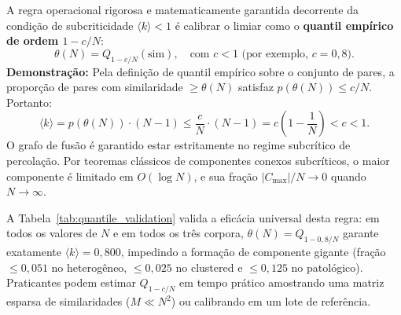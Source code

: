 \documentclass[11pt,a4paper]{article}
\theoremstyle{definition}
\begin{document}
A regra operacional rigorosa e matematicamente garantida decorrente da condi\c{c}\~ao de subcriticidade $\langle k \rangle < 1$ \'e calibrar o limiar como o \textbf{quantil emp\'irico de ordem $1 - c/N$}:
\begin{equation}
\theta(N) = Q_{1 - c/N}(\mathrm{sim}), \quad \text{com } c < 1 \text{ (por exemplo, } c = 0{,}8\text{)}.
\end{equation}
\textbf{Demonstra\c{c}\~ao:} Pela defini\c{c}\~ao de quantil emp\'irico sobre o conjunto de pares, a propor\c{c}\~ao de pares com similaridade $\ge \theta(N)$ satisfaz $p(\theta(N)) \le c/N$. Portanto:
\[
\langle k \rangle = p(\theta(N)) \cdot (N - 1) \le \frac{c}{N} \cdot (N - 1) = c \left(1 - \frac{1}{N}\right) < c < 1.
\]
O grafo de fus\~ao \'e garantido estar estritamente no regime subcr\'itico de percola\c{c}\~ao. Por teoremas cl\'assicos de componentes conexos subcr\'iticos, o maior componente \'e limitado em $O(\log N)$, e sua fra\c{c}\~ao $|C_{\max}|/N \to 0$ quando $N \to \infty$.

A Tabela~\ref{tab:quantile_validation} valida a efic\'acia universal desta regra: em todos os valores de $N$ e em todos os tr\^es corpora, $\theta(N) = Q_{1 - 0{,}8/N}$ garante exatamente $\langle k \rangle = 0{,}800$, impedindo a forma\c{c}\~ao de componente gigante (fra\c{c}\~ao $\le 0{,}051$ no heterog\^eneo, $\le 0{,}025$ no clustered e $\le 0{,}125$ no patol\'ogico). Praticantes podem estimar $Q_{1 - c/N}$ em tempo pr\'atico amostrando uma matriz esparsa de similaridades ($M \ll N^2$) ou calibrando em um lote de refer\^encia.
\end{document}
